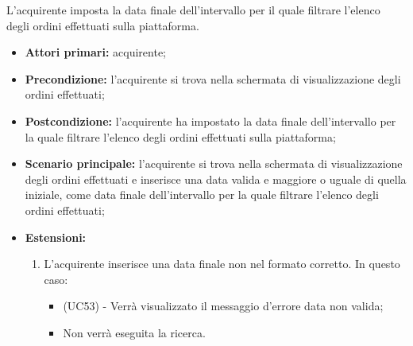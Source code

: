 L'acquirente imposta la data finale dell'intervallo per il quale filtrare l'elenco degli ordini effettuati sulla piattaforma.
\begin{itemize}
    \item \textbf{Attori primari:} acquirente;
    \item \textbf{Precondizione:} l'acquirente si trova nella schermata di visualizzazione degli ordini effettuati;
    \item \textbf{Postcondizione:} l'acquirente ha impostato la data finale dell'intervallo per la quale filtrare l'elenco degli ordini effettuati sulla piattaforma;
    \item \textbf{Scenario principale:} l'acquirente si trova nella schermata di visualizzazione degli ordini effettuati e inserisce una data valida e maggiore o uguale di quella iniziale, come data finale dell'intervallo per la quale filtrare l'elenco degli ordini effettuati;
    \item \textbf{Estensioni:}
    \begin{enumerate}[label=\lett]
        \item L'acquirente inserisce una data finale non nel formato corretto. In questo caso:
        \begin{itemize}
            \item (UC53) - Verrà visualizzato il messaggio d'errore data non valida;
            \item Non verrà eseguita la ricerca.
        \end{itemize} 
    \end{enumerate}
\end{itemize}